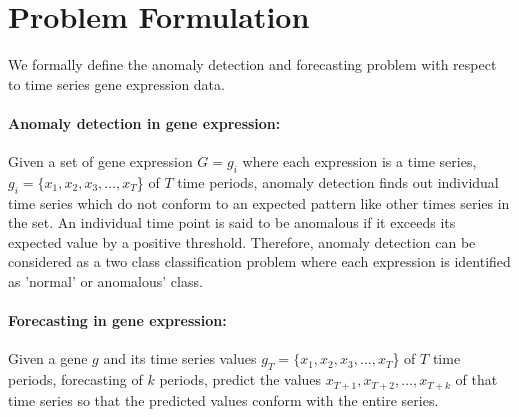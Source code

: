 \section{Problem Formulation}
\label{sec-probdefn}
We formally define the anomaly detection and forecasting problem with respect to time series gene expression data.

\paragraph*{\textbf{Anomaly detection in gene expression:}}
Given a set of gene expression $G={g_i}$ where each expression is a time series, $g_i=\{x_1,x_2,x_3,\dots,x_T$\} of $T$ time periods, anomaly detection finds out individual time series which do not conform to an expected pattern  like other times  series in the set. An individual time point is said to be anomalous if it exceeds  its expected value by a positive threshold. Therefore, anomaly detection can be considered as a two class classification problem where each expression is identified as 'normal' or anomalous' class.


\paragraph*{\textbf{Forecasting in gene expression:}}
Given a gene $g$ and its time series values $g_T=\{x_1,x_2,x_3,\dots,x_T$\} of $T$ time periods, forecasting of $k$ periods, predict the values $x_{T+1},x_{T+2},\dots,x_{T+k}$ of that time series so that the predicted values conform with the entire series. 